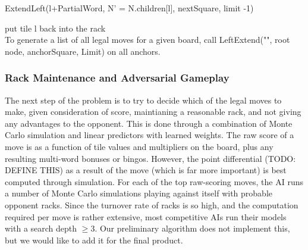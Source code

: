 \documentclass[12pt]{article}
\begin{document}
\quad\quad\quad\quad ExtendLeft(l+PartialWord, N' =
N.children[l], nextSquare, limit -1)

\quad\quad\quad\quad put tile l back into the rack\\
			
To generate a list of all legal moves for a given board, call
LeftExtend("", root node, anchorSquare, Limit) on all anchors.




\subsubsection*{Rack Maintenance and Adversarial Gameplay}
The next step of the problem is to try to decide which of the legal
moves to make, given consideration of score, maintianing a reasonable
rack, and not giving any advantages to the opponent. This is done
through a combination of Monte Carlo simulation and linear predictors
with learned weights. The raw score of a move is as a function of tile
values and multipliers on the board, plus any resulting multi-word
bonuses or bingos. However, the point differential (TODO: DEFINE THIS)
as a result of the move (which is far more important) is best computed
through simulation. For each of the top raw-scoring moves, the AI runs
a number of Monte Carlo simulations playing against itself with
probable opponent racks. Since the turnover rate of racks is so high,
and the computation required per move is rather extensive, most
competitive AIs run their models with a search depth $\geq 3$. Our
preliminary algorithm does not implement this, but we would like to
add it for the final product.
\end{document}
